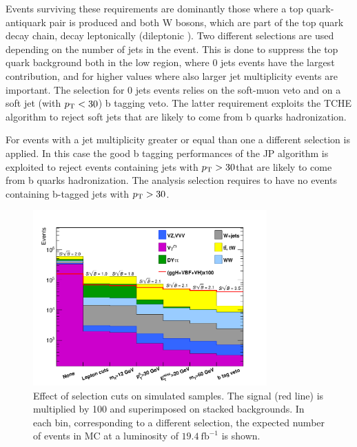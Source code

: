 Events surviving these requirements are dominantly those where a top quark-antiquark pair is produced and both W bosons, which are part of the top quark decay chain, decay leptonically (dileptonic \ttbar).
Two different selections are used depending on the number of jets in the event. This is done to suppress the top quark background both in the low \pth region, where 0 jets events have the largest contribution, and for higher \pth values where also larger jet multiplicity events are important.
The selection for 0 jets events relies on the soft-muon veto and on a soft jet (with $p_\mathrm{T} < 30$\GeV) b tagging veto.
The latter requirement exploits the TCHE algorithm to reject soft jets that are likely to come from b quarks hadronization.

For events with a jet multiplicity greater or equal than one a different selection is applied. In this case the good b tagging performances of the JP algorithm is exploited to reject events containing jets with $p_\mathrm{T} > 30$\GeV that are likely to come from b quarks hadronization. The analysis selection requires to have no events containing b-tagged jets with $p_\mathrm{T} > 30$\GeV.

\begin{figure}[htb]
\centering
\includegraphics[width=0.8\textwidth]{images/cutflow-thesis.pdf}
\caption{Effect of selection cuts on simulated samples. The signal (red line) is multiplied by 100 and superimposed on stacked backgrounds. In each bin, corresponding to a different selection, the expected number of events in MC at a luminosity of $19.4~\mathrm{fb}^{-1}$ is shown.}\label{fig:cutflow}
\end{figure}

